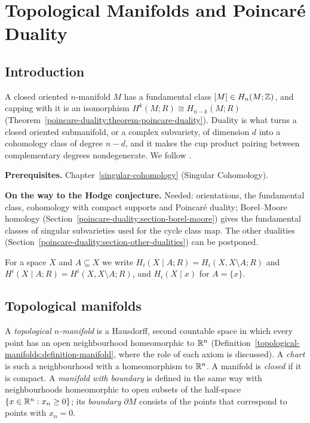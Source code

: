 \chapter{Topological Manifolds and Poincar\'e Duality}\label{poincare-duality}

\section{Introduction}\label{poincare-duality:section-introduction}

A closed oriented $n$-manifold $M$ has a fundamental class $[M] \in H_n(M; \mathbb{Z})$, and capping with it is an isomorphism
$H^k(M; R) \cong H_{n-k}(M; R)$ (Theorem~\ref{poincare-duality:theorem-poincare-duality}). Duality is what turns a closed
oriented submanifold, or a complex subvariety, of dimension $d$ into a cohomology class of degree $n - d$, and it makes the cup
product pairing between complementary degrees nondegenerate. We follow \cite[Section 3.3]{hatcher-at}.

\noindent\textbf{Prerequisites.} Chapter~\ref{singular-cohomology} (Singular Cohomology).

\noindent\textbf{On the way to the Hodge conjecture.} Needed: orientations, the fundamental class, cohomology with compact supports and Poincar\'e duality; Borel--Moore homology
(Section~\ref{poincare-duality:section-borel-moore}) gives the fundamental classes of singular subvarieties used for the cycle class map. The other dualities (Section~\ref{poincare-duality:section-other-dualities}) can be postponed.

For a space $X$ and $A \subseteq X$ we write $H_i(X \mid A; R) = H_i(X, X \setminus A; R)$ and $H^i(X \mid A; R) = H^i(X, X \setminus A; R)$, and
$H_i(X \mid x)$ for $A = \{x\}$.

\section{Topological manifolds}\label{poincare-duality:section-manifolds}

\begin{definition}\label{poincare-duality:definition-manifold}
A \emph{topological $n$-manifold} is a Hausdorff, second countable space in which every point has an open neighbourhood homeomorphic to $\mathbb{R}^n$
(Definition~\ref{topological-manifolds:definition-manifold}, where the role of each axiom is discussed). A
\emph{chart} is such a neighbourhood with a homeomorphism to $\mathbb{R}^n$. A manifold is \emph{closed} if it is compact. A \emph{manifold with boundary} is defined
in the same way with neighbourhoods homeomorphic to open subsets of the half-space $\{x \in \mathbb{R}^n : x_n \geq 0\}$; its \emph{boundary} $\partial M$ consists of the
points that correspond to points with $x_n = 0$.
\end{definition}

